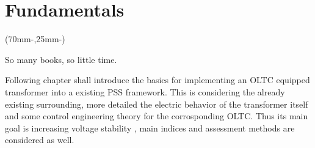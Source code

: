 


\chapter{Fundamentals}
\label{chap:fundamentals}

\begin{textblock*}{.7\textwidth}(70mm-\offset,25mm-\offset)
    \begin{fquote}
        So many books, so little time.
    \end{fquote}
\end{textblock*}

Following chapter shall introduce the basics for implementing an \acs{OLTC} equipped transformer into a existing \acs{PSS} framework.
This is considering the already existing surrounding, more detailed the electric behavior of the transformer itself and some control engineering theory for the corrosponding \acs{OLTC}. 
Thus its main goal is increasing voltage stability \autocite{machowski_2020}, main indices and assessment methods are considered as well.

